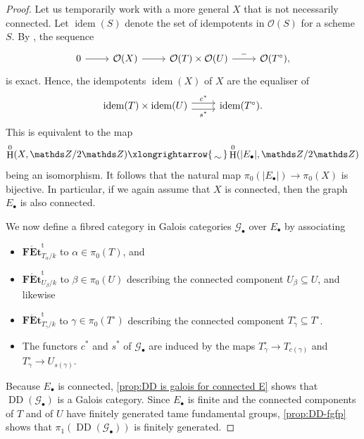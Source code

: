 \documentclass[a4paper,twoside,11pt,reqno]{amsart}
\DeclareMathOperator{\rH}{H}
\renewcommand{\mathbb}{\mathds}
\newcommand{\bZ}{{\mathbb Z}}
\newcommand{\cG}{{\mathcal G}}
\newcommand{\cO}{{\mathcal O}}
\newcommand{\isomto}{\xlongrightarrow{\,\smash{\raisebox{-0.65ex} 
    {\ensuremath{\displaystyle\sim}}}\,}}
\newcommand{\la}{\longrightarrow}
\DeclareMathOperator{\idem}{idem}
\newcommand{\cat}[1]{\mathbf{#1}}
\newcommand{\FEtt}{{\cat{F\acute{E}t}}^{\!\mathrm{t}}}
\DeclareMathOperator{\Desc}{DD}
\theoremstyle{definition}
\numberwithin{equation}{subsection}
\begin{document}
\begin{proof}
Let us temporarily work with a more general $X$ that is not necessarily connected. Let $\idem(S)$ denote the set of idempotents in $\cO(S)$ for a scheme $S$. By \cite[Theorem~2.2]{ArtinFormalModuliII}, the sequence 
\[ 
    \begin{tikzcd}
        0 \ar[r] &\cO(X) \ar[r] &  \cO(T)\times \cO(U) \ar[r,"-"] &\cO(T^\circ),
    \end{tikzcd}
\]
is exact. Hence, the 
idempotents $\idem(X)$ of $X$ are the equaliser of 
\[
\begin{tikzcd}
        \idem(T) \times \idem(U) \ar[r,"c^\ast",shift left=0.7ex] \ar[r,"s^\ast",swap,shift right=0.7ex] 
        & \idem(T^\circ) .
    \end{tikzcd}
\]
This is equivalent to the map 
\[
\rH^0(X,\bZ/2\bZ) \isomto \rH^0(|E_\bullet|,\bZ/2\bZ)
\]
being an isomorphism. It follows that the natural map $\pi_0(|E_\bullet|) \la \pi_0(X)$
is bijective. In particular, if we again assume that $X$ is connected, then the graph $E_\bullet$ is also connected.


We now define a fibred category in Galois categories $\cG_\bullet$ over $E_\bullet$ by associating 
\begin{itemize}
    \item 
    $\FEtt_{T_\alpha/k}$ to $\alpha \in \pi_0(T)$, and
    \item $\FEtt_{U_\beta/k}$ to $\beta \in \pi_0(U)$ describing the connected component $U_\beta \subseteq U$, and likewise
    \item 
    $\FEtt_{T^\circ_\gamma/k}$ to $\gamma \in \pi_0(T^\circ)$ describing the connected component $T^\circ_\gamma \subseteq T^\circ$. 
    \item 
    The functors $c^*$ and $s^*$ of $\cG_\bullet$ are induced by the maps 
    $T^\circ_\gamma\to T_{c(\gamma)}$ and $T^\circ_\gamma\to U_{s(\gamma)}$. 
\end{itemize}
Because $E_\bullet$ is connected, \cref{prop:DD is galois for connected E} shows that $\Desc(\cG_\bullet)$ is a Galois category. Since $E_\bullet$ is finite and the connected components of $T$ and of $U$ have finitely generated tame fundamental groups, \cref{prop:DD-fgfp} shows that $\pi_1(\Desc(\cG_\bullet))$ is finitely generated. 


\end{proof}
\end{document}
